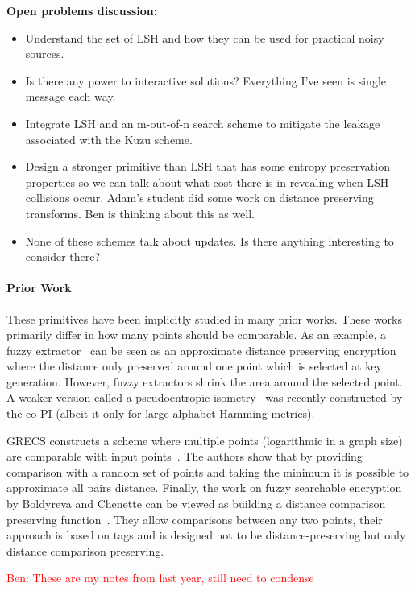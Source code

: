 \documentclass[11pt]{article}
\newcommand{\ben}[1]{\textcolor{red}{Ben: #1}}
\theoremstyle{remark}
\begin{document}
\textbf{Open problems discussion:} 
\begin{itemize}
\item Understand the set of LSH and how they can be used for practical noisy sources.
\item Is there any power to interactive solutions?  Everything I've seen is single message each way.
\item Integrate LSH and an m-out-of-n search scheme to mitigate the leakage associated with the Kuzu scheme.
\item Design a stronger primitive than LSH that has some entropy preservation properties so we can talk about what cost there is in revealing when LSH collisions occur.  Adam's student did some work on distance preserving transforms.  Ben is thinking about this as well.  
\item None of these schemes talk about updates.  Is there anything interesting to consider there?
\end{itemize}

\paragraph{Prior Work}
These primitives have been implicitly studied in many prior works.  These works primarily differ in how many points should be comparable.  As an example, a fuzzy extractor~\cite{DRS04} can be seen as an approximate distance preserving encryption where the distance only preserved around one point which is selected at key generation.  However, fuzzy extractors shrink the area around the selected point.  A weaker version called a pseudoentropic isometry~\cite{cryptoeprint:2016:1100} was recently constructed by the co-PI (albeit it only for large alphabet Hamming metrics).

GRECS constructs a scheme where multiple points (logarithmic in a graph size) are comparable with input points~\cite{meng2015grecs}.  The authors show that by providing comparison with a random set of points and taking the minimum it is possible to approximate all pairs distance.
Finally, the work on fuzzy searchable encryption by Boldyreva and Chenette can be viewed as building a distance comparison preserving function~\cite{boldyreva2014efficient}.  They allow comparisons between any two points, their approach is based on tags and is designed not to be distance-preserving but only distance comparison preserving.

\ben{These are my notes from last year, still need to condense}
\end{document}
